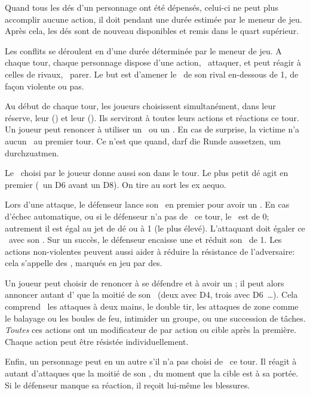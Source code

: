 {		Quand tous les dés d'un personnage ont été dépensés, celui-ci ne peut plus accomplir aucune action, il doit  pendant une durée estimée par le meneur de jeu. Après cela, les dés sont de nouveau disponibles et remis dans le quart supérieur.


		\noindent
		Les conflits se déroulent en  d'une durée déterminée par le meneur de jeu. A chaque tour, chaque personnage dispose d'une action, \pe\ attaquer, et peut réagir à celles de rivaux, \pe\ parer. Le but est d'amener le \HD\ de son rival en-dessous de 1, de façon violente ou pas.

		Au début de chaque tour, les joueurs choisissent simultanément, dans leur réserve, leur  (\AD) et leur  (\RD). Ils serviront à toutes leurs actions et réactions ce tour. Un joueur peut renoncer à utiliser un \AD\ ou un \RD. En cas de surprise, la victime n'a aucun \AD\ au premier tour. Ce n'est que quand, darf die Runde aussetzen, um durchzuatmen.

		Le \AD\ choisi par le joueur donne aussi son  dans le tour. Le plus petit dé agit en premier (\pe\ un D6 avant un D8). On tire au sort les ex aequo.

		Lors d'une attaque, le défenseur lance son \RD\ en premier pour avoir un \TN. En cas d'échec automatique, ou si le défenseur n'a pas de \RD\ ce tour, le \TN\ est de 0; autrement il est égal au jet de dé ou à 1 (le plus élevé). L'attaquant doit égaler ce \TN\ avec son \AD. Sur un succès, le défenseur encaisse une  et réduit son \HD\ de 1. Les actions non-violentes peuvent aussi aider à réduire la résistance de l'adversaire: cela s'appelle des , marqués en jeu par des.

		Un joueur peut choisir de renoncer à se défendre et à avoir un \RD; il peut alors annoncer autant d' que la moitié de son \AD\ (deux avec D4, trois avec D6~\ldots). Cela comprend \pe\ les attaques à deux mains, le double tir, les attaques de zone comme le balayage ou les boules de feu, intimider un groupe, ou une succession de tâches. \emph{Toutes} ces actions ont un modificateur de  par action ou cible après la première. Chaque action peut être résistée individuellement.

		Enfin, un personnage peut en  un autre s'il n'a pas choisi de \AD\ ce tour. Il réagit à autant d'attaques que la moitié de son \RD, du moment que la cible est à sa portée. Si le défenseur manque sa réaction, il reçoit lui-même les blessures.

}
